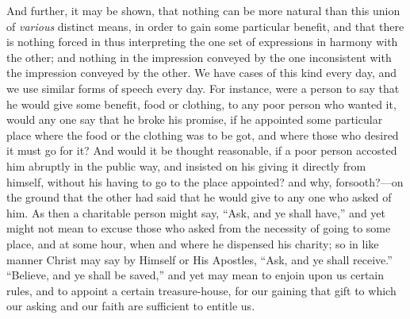 And further, it may be shown, that nothing can be more natural than
this union of \emph{various} distinct means, in order to gain some
particular benefit, and that there is nothing forced in thus
interpreting the one set of expressions in harmony with the other; and
nothing in the impression conveyed by the one inconsistent with the
impression conveyed by the other. We have cases of this kind every
day, and we use similar forms of speech every day. For instance, were
a person to say that he would give some benefit, food or clothing, to
any poor person who wanted it, would any one say that he broke his
promise, if he appointed some particular place where the food or the
clothing was to be got, and where those who desired it must go for it?
And would it be thought reasonable, if a poor person accosted him
abruptly in the public way, and insisted on his giving it directly
from himself, without his having to go to the place appointed? and
why, forsooth?—on the ground that the other had said that he would
give to any one who asked of him. As then a charitable person might
say, ``Ask, and ye shall have,'' and yet might not mean to
excuse those who asked from the necessity of going to some place, and
at some hour, when and where he dispensed his charity; so in like
manner Christ may say by Himself or His Apostles, ``Ask, and ye
shall receive.'' ``Believe, and ye shall be saved,'' and
yet may mean to enjoin upon us certain rules, and to appoint a certain
treasure-house, for our gaining that gift to which our asking and our
faith are sufficient to entitle us.

